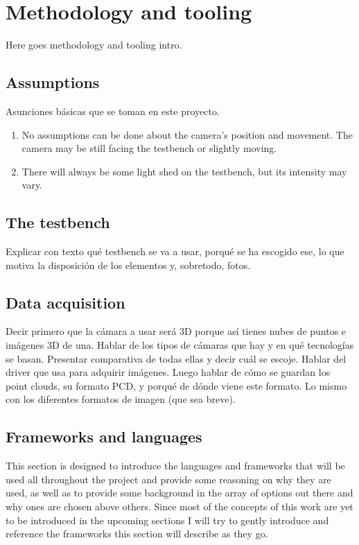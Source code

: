 \documentclass[../main.tex]{subfiles}
\begin{document}
\section{Methodology and tooling} \label{sec:methodology_and_tooling}
Here goes methodology and tooling intro.

\subsection{Assumptions}
Asunciones básicas que se toman en este proyecto.
\begin{enumerate}
    \item No assumptions can be done about the camera's position and movement. The camera may be still facing the testbench or slightly moving.
    \item There will always be some light shed on the testbench, but its intensity may vary.
\end{enumerate}

\subsection{The testbench}
Explicar con texto qué testbench se va a usar, porqué se ha escogido ese, lo que motiva la disposición de los elementos y, sobretodo, fotos.

\subsection{Data acquisition}
Decir primero que la cámara a usar será 3D porque así tienes nubes de puntos e imágenes 3D de una.
Hablar de los tipos de cámaras que hay y en qué tecnologías se basan. Presentar comparativa de todas ellas y decir cuál se escoje. Hablar del driver que usa para adquirir imágenes. Luego hablar de cómo se guardan los point clouds, su formato PCD, y porqué de dónde viene este formato. Lo mismo con los diferentes formatos de imagen (que sea breve).



\subsection{Frameworks and languages}
This section is designed to introduce the languages and frameworks that will be used all throughout the project and provide some reasoning on why they are used, as well as to provide some background in the array of options out there and why ones are chosen above others. Since most of the concepts of this work are yet to be introduced in the upcoming sections I will try to gently introduce and reference the frameworks this section will describe as they go.
\end{document}
